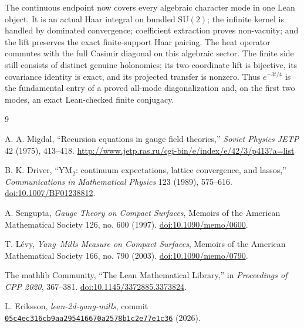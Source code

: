 \documentclass[11pt]{article}
\theoremstyle{definition}
\theoremstyle{remark}
\newcommand{\SU}{\mathrm{SU}(2)}
\begin{document}
The continuous endpoint now covers every algebraic character mode in one
Lean object.  It is an actual Haar integral on bundled $\SU$; the infinite
kernel is handled by dominated convergence; coefficient extraction proves
non-vacuity; and the lift preserves the exact finite-support Haar pairing.
The heat operator commutes with the full Casimir diagonal on this algebraic
sector.  The finite side still consists of distinct genuine holonomies; its
two-coordinate lift is bijective, its covariance identity is exact, and its
projected transfer is nonzero.  Thus $e^{-3t/4}$ is the fundamental entry of a
proved all-mode diagonalization and, on the first two modes, an exact
Lean-checked finite conjugacy.

\begin{thebibliography}{9}

A. A. Migdal,
``Recursion equations in gauge field theories,''
\emph{Soviet Physics JETP} 42 (1975), 413--418.
\url{http://www.jetp.ras.ru/cgi-bin/e/index/e/42/3/p413?a=list}

B. K. Driver,
``YM$_2$: continuum expectations, lattice convergence, and lassos,''
\emph{Communications in Mathematical Physics} 123 (1989), 575--616.
\href{https://doi.org/10.1007/BF01238812}{doi:10.1007/BF01238812}.

A. Sengupta,
\emph{Gauge Theory on Compact Surfaces},
Memoirs of the American Mathematical Society 126, no. 600 (1997).
\href{https://doi.org/10.1090/memo/0600}{doi:10.1090/memo/0600}.

T. L\'evy,
\emph{Yang--Mills Measure on Compact Surfaces},
Memoirs of the American Mathematical Society 166, no. 790 (2003).
\href{https://doi.org/10.1090/memo/0790}{doi:10.1090/memo/0790}.

The mathlib Community,
``The Lean Mathematical Library,''
in \emph{Proceedings of CPP 2020}, 367--381.
\href{https://doi.org/10.1145/3372885.3373824}{doi:10.1145/3372885.3373824}.

L. Eriksson,
\emph{lean-2d-yang-mills}, commit
\href{https://github.com/lluiseriksson/lean-2d-yang-mills/tree/05c4ec316cb9aa295416670a2578b1c2e77e1c36}
{\texttt{05c4ec316cb9aa295416670a2578b1c2e77e1c36}} (2026).

\end{thebibliography}
\end{document}
